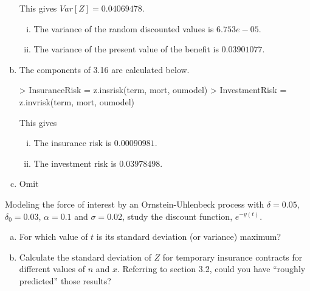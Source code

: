 \documentclass[12pt]{article}
\numberwithin{questioncounter}{section}
\begin{document}
\begin{solution}
\begin{enumerate}[(a)]
This gives $Var[Z] = 0.04069478$.

\begin{enumerate}[(i)]
\item The variance of the random discounted values is $6.753e-05$.
\item The variance of the present value of the benefit is $0.03901077$.
\end{enumerate}

\item The components of 3.16 are calculated below.

\begin{Schunk}
\begin{Sinput}
> InsuranceRisk = z.insrisk(term, mort, oumodel)
> InvestmentRisk = z.invrisk(term, mort, oumodel)
\end{Sinput}
\end{Schunk}

This gives

\begin{enumerate}[(i)]
\item The insurance risk is $0.00090981$.
\item The investment risk is $0.03978498$.
\end{enumerate}

\item Omit

\end{enumerate}

\end{solution}

\begin{question}
Modeling the force of interest by an Ornstein-Uhlenbeck process with $\delta = 0.05$, $\delta_0 = 0.03$, $\alpha = 0.1$ and $\sigma = 0.02$, study the discount function, $e^{-y(t)}$.

\begin{enumerate}[(a)]
\item For which value of $t$ is its standard deviation (or variance) maximum?
\item Calculate the standard deviation of $Z$ for temporary insurance contracts for different values of $n$ and $x$. Referring to section 3.2, could you have ``roughly predicted'' those results?
\end{enumerate}

\end{question}
\end{document}
